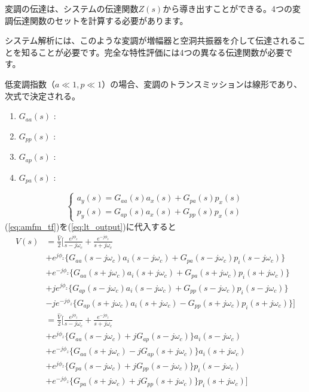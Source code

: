 \documentclass[book]{jlreq}
\begin{document}
変調の伝達は、システムの伝達関数$Z(s)$から導き出すことができる。4つの変調伝達関数のセットを計算する必要があります。

システム解析には、このような変調が増幅器と空洞共振器を介して伝達されることを知ることが必要です。完全な特性評価には4つの異なる伝達関数が必要です。

低変調指数（$a \ll 1, p \ll 1$）の場合、変調のトランスミッションは線形であり、次式で決定される。
%
\begin{enumerate}
    \item $G_{aa}(s)$ : 
    \item $G_{pp}(s)$ :
    \item $G_{ap}(s)$ :
    \item $G_{pa}(s)$ :
\end{enumerate}
%
\begin{equation}
    \left\{
    \begin{matrix}
        a_y(s) = G_{aa}(s) a_x(s) + G_{pa}(s) p_x(s)\\
        p_y(s) = G_{ap}(s) a_x(s) + G_{pp}(s) p_x(s)
        \label{eq:amfm_tf}
    \end{matrix}
    \right .
\end{equation}
%
(\ref{eq:amfm_tf})を(\ref{eq:lt_output})に代入すると
%
\begin{equation}
    \begin{split}
        V(s) &= \frac{\hat{V}}{2}\biggl [ \frac{e^{j\phi_z}}{s-j\omega_c}+\frac{e^{-j\phi_z}}{s+j\omega_c} \\
        &+ e^{j\phi_z}\bigl \{G_{aa}(s-j\omega_c)a_i(s-j\omega_c) + G_{pa}(s-j\omega_c) p_i(s-j\omega_c) \bigr \} \\
        &+ e^{-j\phi_z}\bigl \{G_{aa}(s+j\omega_c)a_i(s+j\omega_c) + G_{pa}(s+j\omega_c) p_i(s+j\omega_c) \bigr \} \\
        &+ j e^{j\phi_z}\bigl \{G_{ap}(s-j\omega_c)a_i(s-j\omega_c) + G_{pp}(s-j\omega_c)p_i(s-j\omega_c) \bigr \}\\
        &- j e^{-j\phi_z}\bigl \{G_{ap}(s+j\omega_c)a_i(s+j\omega_c) -G_{pp}(s+j\omega_c)p_i(s+j\omega_c)\bigr \} \biggr ] \\
        &= \frac{\hat{V}}{2}\biggl [ \frac{e^{j\phi_z}}{s-j\omega_c}+\frac{e^{-j\phi_z}}{s+j\omega_c} \\
        &+ e^{j\phi_z}\{G_{aa}(s-j\omega_c)+j G_{ap}(s-j\omega_c)\}a_i(s-j\omega_c) \\
        &+ e^{-j\phi_z}\{G_{aa}(s+j\omega_c)-j G_{ap}(s+j\omega_c)\}a_i(s+j\omega_c) \\
        &+ e^{j\phi_z}\{G_{pa}(s-j\omega_c) + j G_{pp}(s-j\omega_c)\}p_i(s-j\omega_c) \\
        &+ e^{-j\phi_z}\{G_{pa}(s+j\omega_c) + j G_{pp}(s+j\omega_c)\}p_i(s+j\omega_c)\biggr ]
    \end{split}
    \label{eq:Vc1}
\end{equation}
\end{document}
